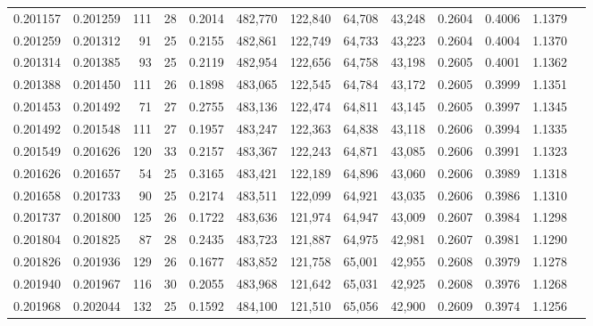 \begin{tabular}{rrrrrrrrrrrrr}
0.201157 & 0.201259 & 111 &  28 &                                     0.2014 & 482,770 & 122,840 &  64,708 &  43,248 & 0.2604 & 0.4006 & 1.1379 \\
0.201259 & 0.201312 &  91 &  25 &                                     0.2155 & 482,861 & 122,749 &  64,733 &  43,223 & 0.2604 & 0.4004 & 1.1370 \\
0.201314 & 0.201385 &  93 &  25 &                                     0.2119 & 482,954 & 122,656 &  64,758 &  43,198 & 0.2605 & 0.4001 & 1.1362 \\
0.201388 & 0.201450 & 111 &  26 &                                     0.1898 & 483,065 & 122,545 &  64,784 &  43,172 & 0.2605 & 0.3999 & 1.1351 \\
0.201453 & 0.201492 &  71 &  27 &                                     0.2755 & 483,136 & 122,474 &  64,811 &  43,145 & 0.2605 & 0.3997 & 1.1345 \\
0.201492 & 0.201548 & 111 &  27 &                                     0.1957 & 483,247 & 122,363 &  64,838 &  43,118 & 0.2606 & 0.3994 & 1.1335 \\
0.201549 & 0.201626 & 120 &  33 &                                     0.2157 & 483,367 & 122,243 &  64,871 &  43,085 & 0.2606 & 0.3991 & 1.1323 \\
0.201626 & 0.201657 &  54 &  25 &                                     0.3165 & 483,421 & 122,189 &  64,896 &  43,060 & 0.2606 & 0.3989 & 1.1318 \\
0.201658 & 0.201733 &  90 &  25 &                                     0.2174 & 483,511 & 122,099 &  64,921 &  43,035 & 0.2606 & 0.3986 & 1.1310 \\
0.201737 & 0.201800 & 125 &  26 &                                     0.1722 & 483,636 & 121,974 &  64,947 &  43,009 & 0.2607 & 0.3984 & 1.1298 \\
0.201804 & 0.201825 &  87 &  28 &                                     0.2435 & 483,723 & 121,887 &  64,975 &  42,981 & 0.2607 & 0.3981 & 1.1290 \\
0.201826 & 0.201936 & 129 &  26 &                                     0.1677 & 483,852 & 121,758 &  65,001 &  42,955 & 0.2608 & 0.3979 & 1.1278 \\
0.201940 & 0.201967 & 116 &  30 &                                     0.2055 & 483,968 & 121,642 &  65,031 &  42,925 & 0.2608 & 0.3976 & 1.1268 \\
0.201968 & 0.202044 & 132 &  25 &                                     0.1592 & 484,100 & 121,510 &  65,056 &  42,900 & 0.2609 & 0.3974 & 1.1256 \\

\end{tabular}
